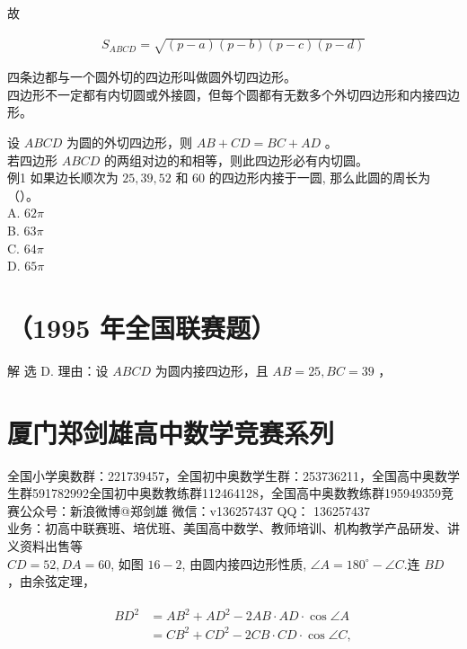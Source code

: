 \documentclass[10pt]{article}
\begin{document}
故

\begin{align*}
S_{A B C D}=\sqrt{(p-a)(p-b)(p-c)(p-d)}
\end{align*}

四条边都与一个圆外切的四边形叫做圆外切四边形。\\
四边形不一定都有内切圆或外接圆，但每个圆都有无数多个外切四边形和内接四边形。

设 $A B C D$ 为圆的外切四边形，则 $A B+C D=B C+A D$ 。\\
若四边形 $A B C D$ 的两组对边的和相等，则此四边形必有内切圆。\\
例1 如果边长顺次为 $25,39,52$ 和 60 的四边形内接于一圆, 那么此圆的周长为（）。\\
A. $62 \pi$\\
B. $63 \pi$\\
C. $64 \pi$\\
D. $65 \pi$

\section*{（1995 年全国联赛题）}
解 选 D. 理由：设 $A B C D$ 为圆内接四边形，且 $A B=25, B C=39$ ，

\section*{厦门郑剑雄高中数学竞赛系列}
全国小学奥数群：221739457，全国初中奥数学生群：253736211，全国高中奥数学生群591782992全国初中奥数教练群112464128，全国高中奥数教练群195949359竞赛公众号：新浪微博@郑剑雄 微信：v136257437 QQ： 136257437\\
业务：初高中联赛班、培优班、美国高中数学、教师培训、机构教学产品研发、讲义资料出售等\\
$C D=52, D A=60$, 如图 $16-2$, 由圆内接四边形性质, $\angle A=180^{\circ}-\angle C$.连 $B D$ ，由余弦定理，

\begin{align*}
\begin{aligned}
B D^{2} & =A B^{2}+A D^{2}-2 A B \cdot A D \cdot \cos \angle A \\
& =C B^{2}+C D^{2}-2 C B \cdot C D \cdot \cos \angle C,
\end{aligned}
\end{align*}
\end{document}
